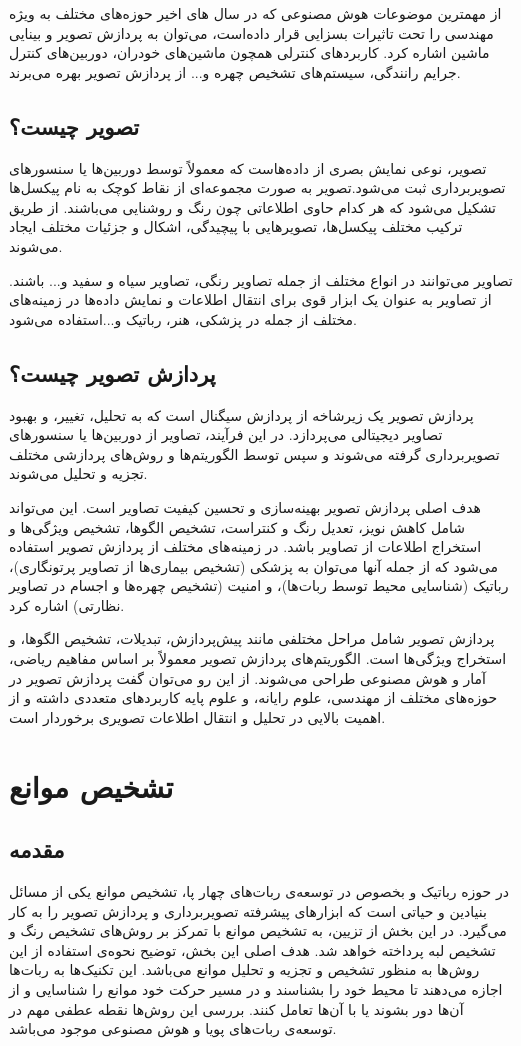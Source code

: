 از مهمترین موضوعات هوش مصنوعی که در سال های اخیر حوزه‌های مختلف به ویژه مهندسی را تحت تاثیرات بسزایی قرار داده‌است، می‌توان به پردازش تصویر و بینایی ماشین اشاره کرد. کاربردهای کنترلی همچون ماشین‌های خودران، دوربین‌های کنترل جرایم رانندگی، سیستم‌های تشخیص چهره و... از پردازش تصویر بهره می‌برند.
\subsection{تصویر چیست؟}

تصویر، نوعی نمایش بصری از داده‌هاست که معمولاً توسط دوربین‌ها یا سنسورهای تصویربرداری ثبت می‌شود.تصویر به صورت مجموعه‌ای از نقاط کوچک به نام پیکسل‌ها تشکیل می‌شود که هر کدام حاوی اطلاعاتی چون رنگ و روشنایی می‌باشند. از طریق ترکیب مختلف پیکسل‌ها، تصویرهایی با پیچیدگی، اشکال و جزئیات مختلف ایجاد می‌شوند.

تصاویر می‌توانند در انواع مختلف از جمله تصاویر رنگی، تصاویر سیاه و سفید و... باشند. از تصاویر به عنوان یک ابزار قوی برای انتقال اطلاعات و نمایش داده‌ها در زمینه‌های مختلف از جمله در پزشکی، هنر، رباتیک و...استفاده می‌شود.
\subsection{پردازش تصویر چیست؟}

پردازش تصویر یک زیرشاخه از پردازش سیگنال است که به تحلیل، تغییر، و بهبود تصاویر دیجیتالی می‌پردازد. در این فرآیند، تصاویر از دوربین‌ها یا سنسورهای تصویربرداری گرفته می‌شوند و سپس توسط الگوریتم‌ها و روش‌های پردازشی مختلف تجزیه و تحلیل می‌شوند.

هدف اصلی پردازش تصویر بهینه‌سازی و تحسین کیفیت تصاویر است. این می‌تواند شامل کاهش نویز، تعدیل رنگ و کنتراست، تشخیص الگوها، تشخیص ویژگی‌ها و استخراج اطلاعات از تصاویر باشد. در زمینه‌های مختلف از پردازش تصویر استفاده می‌شود که از جمله آنها می‌توان به پزشکی (تشخیص بیماری‌ها از تصاویر پرتونگاری)، رباتیک (شناسایی محیط توسط ربات‌ها)، و امنیت (تشخیص چهره‌ها و اجسام در تصاویر نظارتی) اشاره کرد.

پردازش تصویر شامل مراحل مختلفی مانند پیش‌پردازش، تبدیلات، تشخیص الگوها، و استخراج ویژگی‌ها است. الگوریتم‌های پردازش تصویر معمولاً بر اساس مفاهیم ریاضی، آمار و هوش مصنوعی طراحی می‌شوند. از این رو می‌توان گفت پردازش تصویر در حوزه‌های مختلف از مهندسی، علوم رایانه، و علوم پایه کاربردهای متعددی داشته و از اهمیت بالایی در تحلیل و انتقال اطلاعات تصویری برخوردار است.
\newpage
\section{تشخیص موانع}
\subsection{مقدمه}
در حوزه رباتیک و بخصوص در توسعه‌ی ربات‌های چهار پا، تشخیص موانع یکی از مسائل بنیادین و حیاتی است که ابزارهای پیشرفته تصویربرداری و پردازش تصویر را به کار می‌گیرد. در این بخش از تزیین، به تشخیص موانع با تمرکز بر روش‌های تشخیص رنگ و تشخیص لبه پرداخته خواهد شد. هدف اصلی این بخش، توضیح نحوه‌ی استفاده از این روش‌ها به منظور تشخیص و تجزیه و تحلیل موانع می‌باشد. این تکنیک‌ها به ربات‌ها اجازه می‌دهند تا محیط خود را بشناسند و در مسیر حرکت خود موانع را شناسایی و از آن‌ها دور بشوند یا با آن‌ها تعامل کنند. بررسی این روش‌ها نقطه عطفی مهم در توسعه‌ی ربات‌های پویا و هوش مصنوعی موجود می‌باشد.

